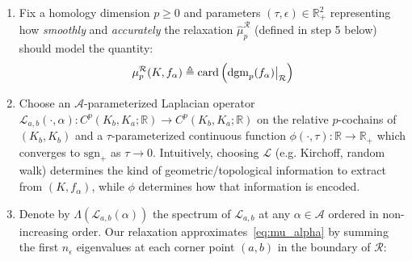 \documentclass[10pt]{article}
\newenvironment{boxedenumerate}
  {\begin{mdframed}[font=\small, linewidth=1pt]}
  {\end{mdframed}}
\numberwithin{equation}{section}
\newcommand{\+}{%
	\raisebox{0.18ex}{\scaleobj{0.55}{+}}
}
\newcommand\restr[2]{{%
  \left.\kern-\nulldelimiterspace %
  #1 %
  \vphantom{\big|} %
  \right|_{#2} %
  }}
\theoremstyle{definition}
\theoremstyle{definition}
\begin{document}
\begin{boxedenumerate}
\begin{enumerate}
	\item Fix a homology dimension $p\geq 0$ and parameters $(\tau, \epsilon) \in \mathbb{R}_+^2$ representing how \emph{smoothly} and \emph{accurately} the relaxation $\hat{\mu}_p^\mathcal{R}$ (defined in step 5 below) should model the quantity: 
	\begin{equation}\label{eq:mu_alpha}
	\mu_p^{\mathcal{R}}(K, f_\alpha) \triangleq 
	\mathrm{card}\left(\restr{\mathrm{dgm}_p(f_\alpha)}{\mathcal{R}} \right) 
	\end{equation}
	\item Choose an $\mathcal{A}$-parameterized Laplacian operator $\mathcal{L}_{a,b}(\cdot, \alpha) : C^p(K_b, K_a; \mathbb{R}) \to C^p(K_b, K_a; \mathbb{R})$ on the relative $p$-cochains of $(K_b, K_b)$ and a 
	$\tau$-parameterized continuous function $\phi(\cdot , \tau ) : \mathbb{R} \to \mathbb{R}_+$ which converges to $\mathrm{sgn}_+$ as $\tau \to 0$.
Intuitively, choosing $\mathcal{L}$ (e.g. Kirchoff, random walk) determines the kind of geometric/topological information to extract from $(K, f_\alpha)$, while $\phi$ determines how that information is encoded.
	\item Denote by $\Lambda(\mathcal{L}_{a,b}(\alpha))$ the spectrum of $\mathcal{L}_{a,b}$ at any $\alpha \in \mathcal{A}$ ordered in non-increasing order. Our relaxation approximates~\eqref{eq:mu_alpha} by summing the first $n_\epsilon$ eigenvalues at each corner point $(a,b)$ in the boundary of $\mathcal{R}$: 

\end{enumerate}
\end{boxedenumerate}
\end{document}
